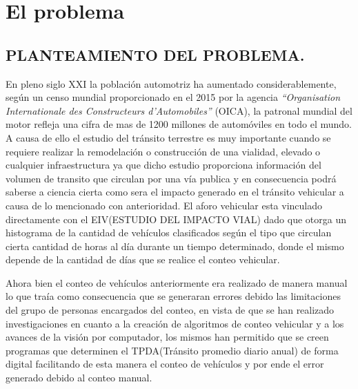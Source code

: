 
\chapter{El problema} %

\label{Capitulo1} %


\section{PLANTEAMIENTO DEL PROBLEMA.}

 En pleno siglo XXI la población automotriz ha aumentado considerablemente, según un censo mundial proporcionado en el 2015 por la agencia \textit{“Organisation Internationale des Constructeurs d’Automobiles”} (OICA), la patronal mundial del motor refleja una cifra de mas de 1200 millones de automóviles en todo el mundo. A causa de ello el estudio del tr\'ansito terrestre es muy importante  cuando se requiere realizar la remodelación o construcción de una vialidad, elevado o cualquier infraestructura ya que dicho estudio proporciona información del volumen de transito que circulan por una vía publica y en consecuencia  podrá saberse a ciencia cierta como sera el impacto generado en el tr\'ansito vehicular a causa de lo mencionado con anterioridad. El aforo vehicular esta vinculado directamente con el  EIV(ESTUDIO DEL IMPACTO VIAL) dado que otorga un histograma de la cantidad de vehículos clasificados según el tipo que circulan cierta cantidad de horas al día durante un tiempo determinado, donde el mismo depende de la cantidad de días que se realice el conteo vehicular.

Ahora bien el conteo de vehículos anteriormente era realizado de manera manual lo que traía como consecuencia que se generaran errores debido las limitaciones del grupo de personas encargados del conteo, en vista de que se han realizado investigaciones en cuanto a la creación de algoritmos de conteo vehicular y a los avances de la visión por computador, los mismos han permitido que se creen programas que determinen el TPDA(Tránsito promedio diario anual) de forma digital facilitando de esta manera el conteo de vehículos  y por ende el error generado debido al conteo manual.

